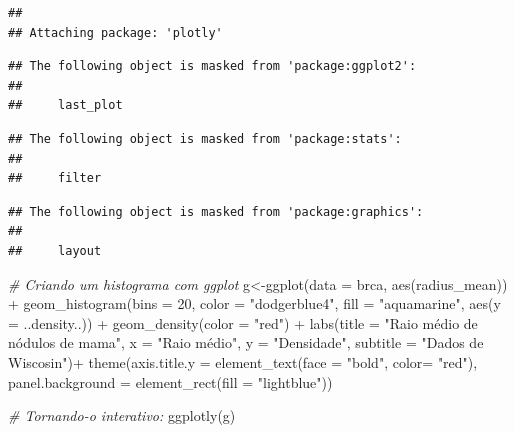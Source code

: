 \documentclass[
]{book}
\newenvironment{Shaded}{\begin{snugshade}}{\end{snugshade}}
\newcommand{\AttributeTok}[1]{\textcolor[rgb]{0.77,0.63,0.00}{#1}}
\newcommand{\CommentTok}[1]{\textcolor[rgb]{0.56,0.35,0.01}{\textit{#1}}}
\newcommand{\DecValTok}[1]{\textcolor[rgb]{0.00,0.00,0.81}{#1}}
\newcommand{\FunctionTok}[1]{\textcolor[rgb]{0.00,0.00,0.00}{#1}}
\newcommand{\NormalTok}[1]{#1}
\newcommand{\OtherTok}[1]{\textcolor[rgb]{0.56,0.35,0.01}{#1}}
\newcommand{\SpecialCharTok}[1]{\textcolor[rgb]{0.00,0.00,0.00}{#1}}
\newcommand{\StringTok}[1]{\textcolor[rgb]{0.31,0.60,0.02}{#1}}
\begin{document}
\begin{verbatim}
## 
## Attaching package: 'plotly'
\end{verbatim}

\begin{verbatim}
## The following object is masked from 'package:ggplot2':
## 
##     last_plot
\end{verbatim}

\begin{verbatim}
## The following object is masked from 'package:stats':
## 
##     filter
\end{verbatim}

\begin{verbatim}
## The following object is masked from 'package:graphics':
## 
##     layout
\end{verbatim}

\begin{Shaded}
\begin{Highlighting}[]
\CommentTok{\# Criando um histograma com ggplot}
\NormalTok{g}\OtherTok{\textless{}{-}}\FunctionTok{ggplot}\NormalTok{(}\AttributeTok{data =}\NormalTok{ brca, }\FunctionTok{aes}\NormalTok{(radius\_mean)) }\SpecialCharTok{+}
  \FunctionTok{geom\_histogram}\NormalTok{(}\AttributeTok{bins =} \DecValTok{20}\NormalTok{, }\AttributeTok{color =} \StringTok{"dodgerblue4"}\NormalTok{, }\AttributeTok{fill =} \StringTok{"aquamarine"}\NormalTok{,}
                 \FunctionTok{aes}\NormalTok{(}\AttributeTok{y =}\NormalTok{ ..density..)) }\SpecialCharTok{+}
  \FunctionTok{geom\_density}\NormalTok{(}\AttributeTok{color =} \StringTok{"red"}\NormalTok{) }\SpecialCharTok{+}
  \FunctionTok{labs}\NormalTok{(}\AttributeTok{title =} \StringTok{"Raio médio de nódulos de mama"}\NormalTok{,}
       \AttributeTok{x =} \StringTok{"Raio médio"}\NormalTok{,}
       \AttributeTok{y =} \StringTok{"Densidade"}\NormalTok{,}
       \AttributeTok{subtitle =} \StringTok{"Dados de Wiscosin"}\NormalTok{)}\SpecialCharTok{+}
  \FunctionTok{theme}\NormalTok{(}\AttributeTok{axis.title.y =} \FunctionTok{element\_text}\NormalTok{(}\AttributeTok{face =} \StringTok{"bold"}\NormalTok{, }\AttributeTok{color=} \StringTok{"red"}\NormalTok{),}
        \AttributeTok{panel.background =} \FunctionTok{element\_rect}\NormalTok{(}\AttributeTok{fill =} \StringTok{"lightblue"}\NormalTok{))}

\CommentTok{\# Tornando{-}o interativo:}
\FunctionTok{ggplotly}\NormalTok{(g)}
\end{Highlighting}
\end{Shaded}
\end{document}
